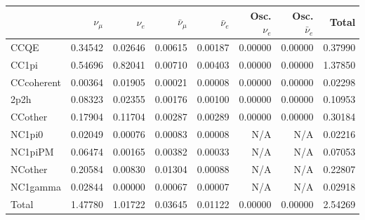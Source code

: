 \begin{tabular} { | l ||r | r | r | r | r | r | | r | }
\hline
              & $\nu_\mu$            & $\nu_e$              & $\bar{\nu}_{\mu}$    & $\bar{\nu}_{e}$      & Osc. $\nu_e$         & Osc. $\bar{\nu}_{e}$ & Total                \\ \hline\hline
 CCQE         & 0.34542              & 0.02646              & 0.00615              & 0.00187              & 0.00000              & 0.00000              & 0.37990              \\ \hline
 CC1pi        & 0.54696              & 0.82041              & 0.00710              & 0.00403              & 0.00000              & 0.00000              & 1.37850              \\ \hline
 CCcoherent   & 0.00364              & 0.01905              & 0.00021              & 0.00008              & 0.00000              & 0.00000              & 0.02298              \\ \hline
 2p2h         & 0.08323              & 0.02355              & 0.00176              & 0.00100              & 0.00000              & 0.00000              & 0.10953              \\ \hline
 CCother      & 0.17904              & 0.11704              & 0.00287              & 0.00289              & 0.00000              & 0.00000              & 0.30184              \\ \hline
 NC1pi0       & 0.02049              & 0.00076              & 0.00083              & 0.00008              & N/A                  & N/A                  & 0.02216              \\ \hline
 NC1piPM      & 0.06474              & 0.00165              & 0.00382              & 0.00033              & N/A                  & N/A                  & 0.07053              \\ \hline
 NCother      & 0.20584              & 0.00830              & 0.01304              & 0.00088              & N/A                  & N/A                  & 0.22807              \\ \hline
 NC1gamma     & 0.02844              & 0.00000              & 0.00067              & 0.00007              & N/A                  & N/A                  & 0.02918              \\ \hline
\hline
 Total        & 1.47780              & 1.01722              & 0.03645              & 0.01122              & 0.00000              & 0.00000              & 2.54269              \\ \hline

\end{tabular}
